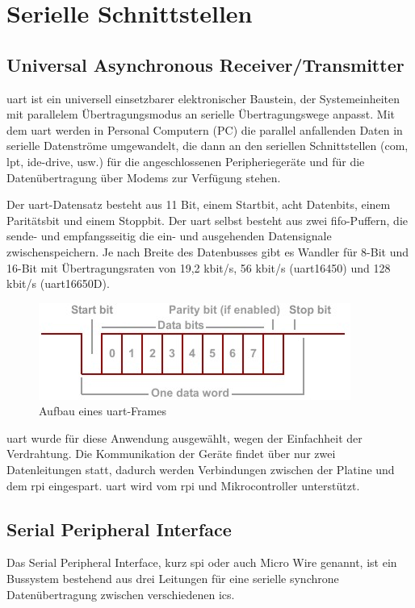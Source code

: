 \section{Serielle Schnittstellen}
\subsection{Universal Asynchronous Receiver/Transmitter}
\ac{uart} ist ein universell einsetzbarer elektronischer Baustein, der Systemeinheiten mit parallelem Übertragungsmodus an serielle Übertragungswege anpasst.
Mit dem \ac{uart} werden in Personal Computern (PC) die parallel anfallenden Daten in serielle Datenströme umgewandelt, die dann an den seriellen Schnittstellen (\acs{com}, \acs{lpt}, \acs{ide-drive}, usw.) für die angeschlossenen Peripheriegeräte und für die Datenübertragung über Modems zur Verfügung stehen. \cite{itwissen-uart}\par

Der \ac{uart}-Datensatz besteht aus 11 Bit, einem Startbit, acht Datenbits, einem Paritätsbit und einem Stoppbit.
Der \ac{uart} selbst besteht aus zwei \ac{fifo}-Puffern, die sende- und empfangsseitig die ein- und ausgehenden Datensignale zwischenspeichern.
Je nach Breite des Datenbusses gibt es Wandler für 8-Bit und 16-Bit mit Übertragungsraten von 19,2 kbit/s, 56 kbit/s (\ac{uart}16450) und 128 kbit/s (\ac{uart}16650D). \cite{itwissen-uart}\par
\begin{figure}[H]
	\centering
	\includegraphics[width=.9\linewidth]{images/technische_grundlagen/tide_uart_data.png}
	\caption{Aufbau eines \ac{uart}-Frames \cite{tibbo-uart}}
\end{figure}

\ac{uart} wurde für diese Anwendung ausgewählt, wegen der Einfachheit der Verdrahtung.
Die Kommunikation der Geräte findet über nur zwei Datenleitungen statt, dadurch werden Verbindungen zwischen der Platine und dem \ac{rpi} eingespart.
\ac{uart} wird vom \ac{rpi} und Mikrocontroller unterstützt.


\subsection{Serial Peripheral Interface}
Das Serial Peripheral Interface, kurz \ac{spi} oder auch Micro Wire genannt, ist ein Bussystem bestehend aus drei Leitungen für eine serielle synchrone Datenübertragung zwischen verschiedenen \acp{ic}. \cite{mikrocontroller-spi}\par

